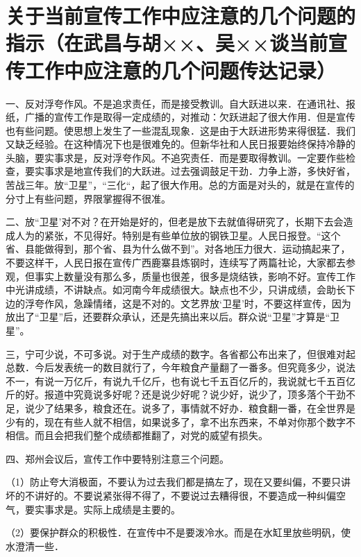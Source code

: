 \section[关于当前宣传工作中应注意的几个问题的指示（在武昌与胡××、吴××谈当前宣传工作中应注意的几个问题传达记录）（一九五八年十二月六日）]{关于当前宣传工作中应注意的几个问题的指示（在武昌与胡××、吴××谈当前宣传工作中应注意的几个问题传达记录）}


一、反对浮夸作风。不是追求责任，而是接受教训。自大跃进以来．在通讯社、报纸，广播的宣传工作是取得一定成绩的，对推动：欠跃进起了很大作用．但是宣传也有些问题。使思想上发生了一些混乱现象．这是由于大跃进形势来得很猛．我们又缺乏经验。在这种情况下也是很难免的。但新华社和人民日报要始终保持冷静的头脑，要实事求是，反对浮夸作风。不追究责任．而是要取得教训。一定要作些检查，要实事求是地宣传我们的大跃进。过去强调鼓足干劲．力争上游，多快好省，苦战三年。放“卫星”，“三化“，起了很大作用。总的方面是对头的，就是在宣传的分寸上有些问题，界限掌握得不很准。

二、放“卫星’对不对？在开始是好的，但老是放下去就值得研究了，长期下去会造成人为的紧张，不见得好。特别是有些单位放的钢铁卫星。人民日报登。“这个省、县能做得到，那个省、县为什么做不到”。对各地压力很大．运动搞起来了，不要这样干，人民日报在宣传广西鹿寨县炼钢时，连续写了两篇社论，大家都去参观，但事实上数量没有那么多，质量也很差，很多是烧结铁，影响不好。宣传工作中光讲成绩，不讲缺点。如河南今年成绩很大。缺点也不少，只讲成绩，会助长下边的浮夸作风，急躁情绪，这是不对的。文艺界放‘卫星’时，不要这样宣传，因为放出了“卫星”后，还要群众承认，还是先搞出来以后。群众说“卫星”才算是“卫星”。

三，宁可少说，不可多说。对于生产成绩的数字。各省都公布出来了，但很难对起总数．今后发表统一的数目就行了，今年粮食产量翻了一番多。但究竟多少，说法不一，有说一万亿斤，有说九千亿斤，也有说七千五百亿斤的，我说就七千五百亿斤的好。报道中究竟说多好呢？还是说少好呢？说少好，说少了，顶多落个干劲不足，说少了结果多，粮食还在。说多了，事情就不好办．粮食翻一番，在全世界是少有的，现在有些人就不相信，如果说多了，拿不出东西来，不单对你那个数字不相信。而且会把我们整个成绩都推翻了，对党的威望有损失。

四、郑州会议后，宣传工作中要特别注意三个问题。

（1）防止夸大消极面，不要认为过去我们都是搞左了，现在又要纠偏，不要只讲坏的不讲好的。不要说紧张得不得了，不要说过去糟得很，不要造成一种纠偏空气，要实事求是。实际上成绩是主要的。

（2）要保护群众的积极性．在宣传中不是要泼冷水。而是在水缸里放些明矾，使水澄清一些．

